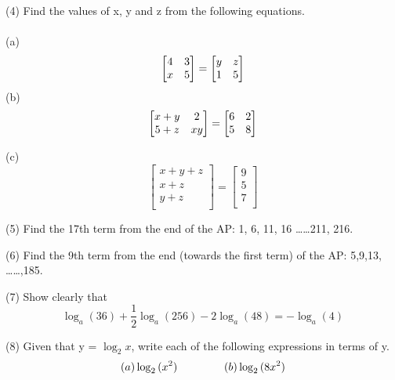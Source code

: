 \documentclass[11pt]{article}
\begin{document}
(4) Find the values of x, y and z from the following equations.
\\
\\
(a) 
\begin{equation}
\begin{bmatrix}
4 & 3\\
x & 5\\
\end{bmatrix}
=
\begin{bmatrix}
y & z\\
1 & 5\\
\end{bmatrix}\vspace{3mm}
\end{equation}
(b)
\begin{equation}
\begin{bmatrix}
x+y & 2\\
5+z & xy\\
\end{bmatrix}
=
\begin{bmatrix}
6 & 2\\
5 & 8\\
\end{bmatrix}\vspace{3mm}
\end{equation}

(c)
\begin{equation}
\begin{bmatrix}
x+y+z\\
x+z\\
y+z\\
\end{bmatrix}
=
\begin{bmatrix}
9\\
5\\
7\\
\end{bmatrix}
\end{equation}

(5) Find the 17th term from the end of the AP: 1, 6, 11, 16 \ldots \ldots 211, 216.\vspace{3mm}

(6) Find the 9th term from the end (towards the first term) of the AP: 5,9,13, \ldots \ldots ,185.\vspace{3mm}

(7) Show clearly that
\begin{equation*}
\log_a{(36)}+\frac{1}{2}\log_a{(256)}-2\log_a{(48)}=-\log_a{(4)}
\end{equation*}

(8) Given that y = $\log_2{x}$, write each of the following expressions in terms of y.
\begin{align*}
(a) \log_2{(x^2)} \hspace{15mm} (b) \log_2{(8x^2)}
\end{align*}






\
\end{document}

